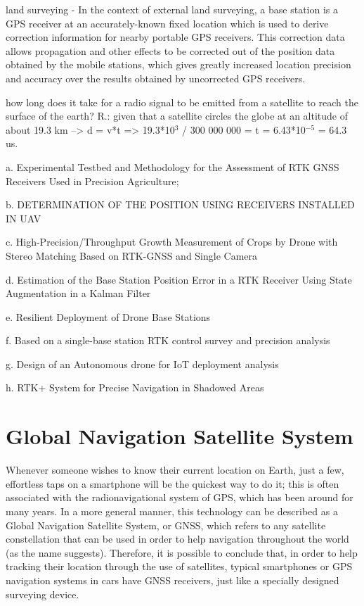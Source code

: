 \begin{itemize}
        land surveying - In the context of external land surveying, a base station is a GPS receiver at an accurately-known fixed location which is used to derive correction information for nearby portable GPS receivers. This correction data allows propagation and other effects to be corrected out of the position data obtained by the mobile stations, which gives greatly increased location precision and accuracy over the results obtained by uncorrected GPS receivers.

        how long does it take for a radio signal to be emitted from a satellite to reach the surface of the earth? 
        R.: given that a satellite circles the globe at an altitude of about 19.3 km --> d = v*t => 19.3*10$^3$ / 300 000 000 = t = 6.43*10$^{-5}$ = 64.3 us.

    a. Experimental Testbed and Methodology for the
    Assessment of RTK GNSS Receivers Used
    in Precision Agriculture;

    b. DETERMINATION OF THE POSITION USING
    RECEIVERS INSTALLED IN UAV

    c. High-Precision/Throughput Growth Measurement of
    Crops by Drone with Stereo Matching Based on
    RTK-GNSS and Single Camera

    d. Estimation of the Base Station Position Error in a
    RTK Receiver Using State Augmentation in a
    Kalman Filter

    e. Resilient Deployment of Drone Base Stations

    f. Based on a single-base station RTK control survey
    and precision analysis 

    g. Design of an Autonomous drone for IoT deployment
    analysis 

    h. RTK+ System for Precise Navigation in Shadowed
    Areas 
\end{itemize}

\section{Global Navigation Satellite System}\label{sec:II_gnss}

Whenever someone wishes to know their current location on Earth, just a few, effortless taps on a smartphone will be the quickest way to do it; this is often associated with the radionavigational system of GPS, which has been around for many years. In a more general manner, this technology can be described as a Global Navigation Satellite System, or GNSS, which refers to any satellite constellation that can be used in order to help navigation throughout the world (as the name suggests).
Therefore, it is possible to conclude that, in order to help tracking their location through the use of satellites, typical smartphones or GPS navigation systems in cars have GNSS receivers, just like a specially designed surveying device.

